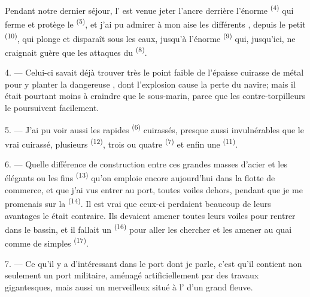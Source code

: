 Pendant notre dernier séjour, l' est venue jeter l'ancre
derrière l'énorme  \textsuperscript{(4)} qui ferme et protège le
 \textsuperscript{(5)}, et j'ai pu admirer à mon aise les
différents , depuis le petit 
\textsuperscript{(10)}, qui plonge et disparaît sous les eaux, jusqu'à l'énorme
 \textsuperscript{(9)} qui, jusqu'ici, ne craignait guère que
les attaques du  \textsuperscript{(8)}.

\VUsaut{3.0mm}
\VUsaut{3.0mm}

4. --- Celui-ci savait déjà trouver très  le point faible de
l'épaisse cuirasse de métal pour y planter la dangereuse ,
dont l'explosion cause la perte du navire; mais il était pourtant moins à
craindre que le sous-marin, parce que les contre-torpilleurs le poursuivent
facilement.

5. --- J'ai pu voir aussi les rapides  \textsuperscript{(6)}
cuirassés, presque aussi invulnérables que le vrai cuirassé, plusieurs
 \textsuperscript{(12)}, trois ou quatre 
\textsuperscript{(7)} et enfin une  \textsuperscript{(11)}.

6. --- Quelle différence de construction entre ces grandes masses d'acier et les
élégants  ou les fins  \textsuperscript{(13)}
qu'on emploie encore aujourd'hui dans la flotte de commerce, et que j'ai vus
entrer au port, toutes voiles dehors, pendant que je me promenais sur la
 \textsuperscript{(14)}. Il est vrai que ceux-ci perdaient
beaucoup de leurs avantages  le  était contraire. Ils
devaient amener toutes leurs voiles pour rentrer dans le bassin, et il fallait
un  \textsuperscript{(16)} pour aller les chercher et les
amener au quai comme de simples  \textsuperscript{(17)}.

\VUsaut{3.0mm}
\VUsaut{3.0mm}

7. --- Ce qu'il y a d'intéressant dans le port dont je parle, c'est qu'il
contient non seulement un port militaire, aménagé artificiellement par des
travaux gigantesques, mais aussi un merveilleux  situé
à l' d'un grand fleuve.

